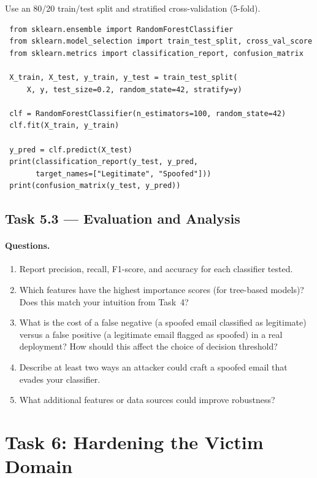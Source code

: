 \documentclass[11pt]{article}
\begin{document}
Use an 80/20 train/test split and stratified cross-validation
(5-fold).

\begin{listing}[H]
\begin{verbatim}
 from sklearn.ensemble import RandomForestClassifier
 from sklearn.model_selection import train_test_split, cross_val_score
 from sklearn.metrics import classification_report, confusion_matrix

 X_train, X_test, y_train, y_test = train_test_split(
     X, y, test_size=0.2, random_state=42, stratify=y)

 clf = RandomForestClassifier(n_estimators=100, random_state=42)
 clf.fit(X_train, y_train)

 y_pred = clf.predict(X_test)
 print(classification_report(y_test, y_pred,
       target_names=["Legitimate", "Spoofed"]))
 print(confusion_matrix(y_test, y_pred))
\end{verbatim}
\end{listing}

\subsection{Task 5.3 --- Evaluation and Analysis}

\paragraph{Questions.}
\begin{enumerate}[noitemsep]
  \item Report precision, recall, F1-score, and accuracy for each
    classifier tested.
  \item Which features have the highest importance scores (for
    tree-based models)?
    Does this match your intuition from Task~4?
  \item What is the cost of a false negative (a spoofed email
    classified as legitimate) versus a false positive (a legitimate
    email flagged as spoofed) in a real deployment?
    How should this affect the choice of decision threshold?
  \item Describe at least two ways an attacker could craft a spoofed
    email that evades your classifier.
  \item What additional features or data sources could improve
    robustness?
\end{enumerate}

\section{Task 6: Hardening the Victim Domain}
\end{document}
